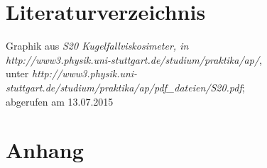 \documentclass[fontsize=12pt]{scrartcl}
\begin{document}
\section{Literaturverzeichnis}

\renewcommand{\refname}{~}
\vspace{-30pt}
\begin{thebibliography}{xx}
     	Graphik aus \textit{\glqq S20 Kugelfallviskosimeter\grqq , in 	\\
   								http://www3.physik.uni-stuttgart.de/studium/praktika/ap/}, \\
   								unter \textit{http://www3.physik.uni-stuttgart.de/studium/praktika/ap/pdf\_dateien/S20.pdf}; \\
   								abgerufen am  13.07.2015
\end{thebibliography}

\section{Anhang}
\end{document}

